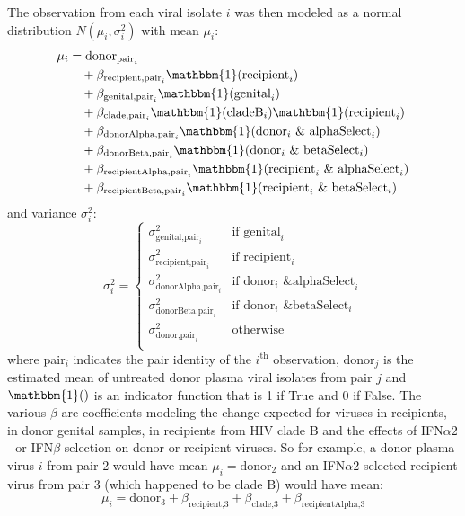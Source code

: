 \documentclass[12pt]{article}
\newcommand{\ifna}{IFN${\alpha 2}$}
\newcommand{\ifnb}{IFN${\beta}$}
\begin{document}
The observation from each viral isolate $i$ was then modeled as a normal distribution $N(\mu_i,\sigma^2_i)$ with mean $\mu_i$:
\begin{align*}
  \mu_i&= \text{donor}_{\text{pair}_i}\\
  &\quad+ \beta_{\text{recipient,pair}_i} \mathbbm{1}(\text{recipient}_i)\\
  &\quad+ \beta_{\text{genital,pair}_i} \mathbbm{1}(\text{genital}_i)\\
  &\quad+ \beta_{\text{clade,pair}_i} \mathbbm{1}(\text{cladeB}_i)\mathbbm{1}(\text{recipient}_i)\\
  &\quad+ \beta_{\text{donorAlpha,pair}_i} \mathbbm{1}(\text{donor}_i \text{ \& alphaSelect}_i)\\
  &\quad+ \beta_{\text{donorBeta,pair}_i} \mathbbm{1}(\text{donor}_i \text{ \& betaSelect}_i)\\
  &\quad+ \beta_{\text{recipientAlpha,pair}_i} \mathbbm{1}(\text{recipient}_i\text{ \& alphaSelect}_i)\\
  &\quad+ \beta_{\text{recipientBeta,pair}_i} \mathbbm{1}(\text{recipient}_i \text{ \& betaSelect}_i) \\
\end{align*}
and variance $\sigma^2_i$:
\[
  \sigma^2_i = \begin{cases}
    \sigma^2_{\text{genital,pair}_i} & \text{if } \text{genital}_i\\
    \sigma^2_{\text{recipient,pair}_i} & \text{if } \text{recipient}_i\\
    \sigma^2_{\text{donorAlpha,pair}_i} & \text{if } \text{donor}_i \text{ \& alphaSelect}_i\\
    \sigma^2_{\text{donorBeta,pair}_i} & \text{if } \text{donor}_i \text{ \& betaSelect}_i\\
    \sigma^2_{\text{donor,pair}_i} & \text{otherwise}\\
  \end{cases}
\]
where pair$_i$ indicates the pair identity of the $i^\text{th}$ observation,
  $\text{donor}_j$ is the estimated mean of untreated donor plasma viral isolates from pair $j$
  and $\mathbbm{1}()$ is an indicator function that is 1 if True and 0 if False.
  The various $\beta$ are coefficients modeling the change expected for viruses in recipients, in donor genital samples,
  in recipients from HIV clade B and the effects of \ifna{}- or \ifnb{}-selection on donor or recipient viruses.
  So for example, a donor plasma virus $i$ from pair 2 would have mean $\mu_i = \text{donor}_{2}$
  and an \ifna{}-selected recipient virus from pair 3 (which happened to be clade B) would have mean:
\[\mu_i=\text{donor}_{3} + \beta_{\text{recipient,3}} + \beta_{\text{clade,3}} + \beta_{\text{recipientAlpha,3}}\]
\end{document}
